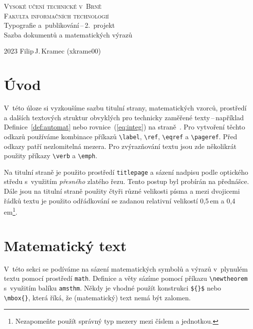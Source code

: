 \documentclass[a4paper, twocolumn, 11pt]{article}
\theoremstyle{plain}
\begin{document}
\begin{titlepage}
	\begin{center}
		{\Huge \textsc{Vysoké učení technické v~Brně}\\[0.5em]}
		{\huge \textsc{Fakulta informačních technologií}}\\
		{\LARGE Typografie a~publikování\,--\,2.\ projekt\\[0.4em]
			Sazba dokumentů a matematických výrazů}\\
	\end{center}
	{\Large 2023 \hfill Filip\,J.\,Kramec (xkrame00)}
\end{titlepage}

\section*{Úvod}

V~této úloze si vyzkoušíme sazbu titulní strany, mate\-matických vzorců,
prostředí a dalších textových struktur obvyklých pro technicky zaměřené texty\,--\,například
Defi\-nice~\ref{def:automat} nebo rovnice~(\ref{eq:integ}) na straně~\pageref{def:automat}.
Pro vytvoření těchto odkazů používáme kombinace příkazů
\verb|\label|, \verb|\ref|, \verb|\eqref| a \verb|\pageref|. Před odkazy patří nezlomitelná mezera.
Pro zvýrazňování textu jsou zde několikrát použity příkazy \verb|\verb| a \verb|\emph|.

Na titulní straně je použito prostředí \texttt{titlepage} a sázení nadpisu podle
optického středu s~využitím \emph{přesného} zlatého řezu. Tento postup byl probírán na přednášce.
Dále jsou na titulní straně použity čtyři různé velikosti písma a mezi dvojicemi řádků textu
je použito odřádkování se zadanou relativní velikostí 0,5\,em a
0,4\,em\footnote{Nezapomeňte použít správný typ mezery mezi číslem a jednotkou.}.

\section{Matematický text}

V~této sekci se podíváme na sázení matematických symbolů a výrazů v~plynulém textu pomocí prostředí
\texttt{math}. Definice a věty sázíme pomocí příkazu \verb|\newtheorem| s~využitím balíku
\texttt{amsthm}. Někdy je vhodné použít konstrukci \verb|${}$| nebo \verb|\mbox{}|,
která říká, že (matematický) text nemá být zalomen.
\end{document}
